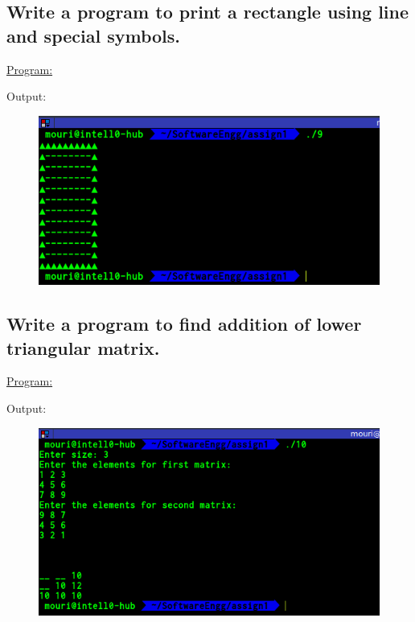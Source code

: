 \documentclass[a4paper,11pt]{article}
\begin{document}
\subsection{Write a program to print a rectangle using line and special symbols.}
\underline{Program:}

Output:
\begin{figure}[H]
\centering
\includegraphics[width=350pt,height=\textheight,keepaspectratio]{./pics/9.png}
\end{figure}
\bigskip

\subsection{Write a program to find addition of lower triangular matrix.}
\underline{Program:}

Output:
\begin{figure}[H]
\centering
\includegraphics[width=350pt,height=\textheight,keepaspectratio]{./pics/10.png}
\end{figure}
\bigskip
\end{document}
